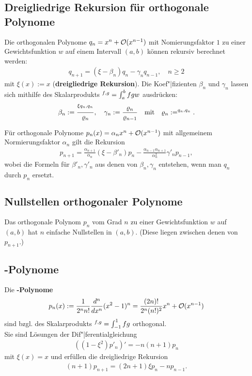 \pagebreak

\subsection{%
    Dreigliedrige Rekursion für orthogonale Polynome%
}

Die orthogonalen Polynome $q_n = x^n + \mathcal{O}(x^{n-1})$ mit Nomierungsfaktor $1$
zu einer Gewichtsfunktion $w$ auf einem Intervall $(a, b)$ können rekursiv
berechnet werden:
\begin{align*}
    q_{n+1} = (\xi - \beta_n) q_n - \gamma_n q_{n-1},\quad
    n \ge 2
\end{align*}
mit $\xi(x) := x$
(\textbf{dreigliedrige Rekursion}).
Die Koef"|fizienten $\beta_n$ und $\gamma_n$ lassen sich mithilfe des
Skalarprodukts
$\sp{f, g} = \int_a^b f g w$ ausdrücken:
\begin{align*}
    \beta_n := \frac{\sp{\xi q_n, q_n}}{\varrho_n},\quad
    \gamma_n := \frac{\varrho_n}{\varrho_{n-1}}
    \quad\text{mit}\quad \varrho_n := \sp{q_n, q_n}.
\end{align*}

Für orthogonale Polynome $p_n(x) = \alpha_n x^n + \mathcal{O}(x^{n-1})$ mit
allgemeinem Normierungsfaktor $\alpha_n$ gilt die Rekursion
\begin{align*}
    p_{n+1} = \frac{\alpha_{n+1}}{\alpha_n} (\xi - \beta'_n) p_n -
    \frac{\alpha_{n-1} \alpha_{n+1}}{\alpha_n^2} \gamma'_n p_{n-1},
\end{align*}
wobei die Formeln für $\beta'_n, \gamma'_n$ aus denen von $\beta_n, \gamma_n$
entstehen, wenn man $q_n$ durch $p_n$ ersetzt.

\subsection{%
    Nullstellen orthogonaler Polynome%
}

Das orthogonale Polynom $p_n$ vom Grad $n$ zu einer Gewichtsfunktion $w$
auf $(a, b)$ hat $n$ einfache Nullstellen in $(a, b)$.
(Diese liegen zwischen denen von $p_{n+1}$.)

\subsection{%
    -Polynome%
}

Die \textbf{-Polynome}
\begin{align*}
    p_n(x) := \frac{1}{2^n n!} \frac{d^n}{dx^n} (x^2 - 1)^n
    = \frac{(2n)!}{2^n (n!)^2} x^n + \mathcal{O}(x^{n-1})
\end{align*}
sind bzgl. des Skalarprodukts $\sp{f, g} = \int_{-1}^1 f g$
orthogonal. \\
Sie sind Lösungen der Dif"|ferentialgleichung
\begin{align*}
    ((1 - \xi^2) p'_n)' = -n (n + 1) p_n
\end{align*}
mit $\xi(x) = x$ und erfüllen die dreigliedrige Rekursion
\begin{align*}
    (n + 1) p_{n+1} = (2n + 1) \xi p_n - n p_{n-1}.
\end{align*}

